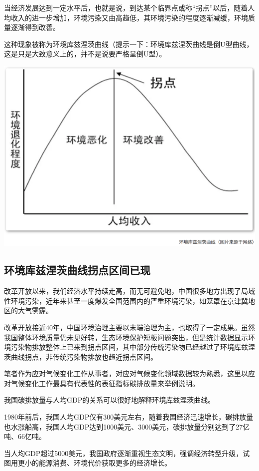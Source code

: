 \documentclass[]{book}
\begin{document}
当经济发展达到一定水平后，也就是说，到达某个临界点或称``拐点''以后，随着人均收入的进一步增加，环境污染又由高趋低，其环境污染的程度逐渐减缓，环境质量逐渐得到改善。

这种现象被称为环境库兹涅茨曲线（提示一下：环境库兹涅茨曲线是倒U型曲线，这是只是大致意义上的，并不是说要严格呈倒U型）。

\includegraphics[width=8.33in]{images/huanjing1}

\subsection{环境库兹涅茨曲线拐点区间已现}

改革开放以来，我们经济水平持续走高，而无可避免地，中国很多地方出现了局域性环境污染，近年来甚至一度爆发全国范围内的严重环境污染，如笼罩在京津冀地区的大气雾霾。

改革开放接近40年，中国环境治理主要以末端治理为主，也取得了一定成果。虽然我国整体环境质量仍未见好转，生态环境保护短板问题突出，但是统计数据显示环境污染物排放整体上已来到拐点区间，其中部分传统污染物已经越过了环境库兹涅茨曲线拐点，非传统污染物排放也趋近拐点区间。

笔者作为应对气候变化工作从事者，对应对气候变化领域数据较为熟悉，这里以应对气候变化工作最具有代表性的表征指标碳排放量来举例说明。

我国碳排放量与人均GDP的关系可以很好地解释环境库兹涅茨曲线。

1980年前后，我国人均GDP仅有300美元左右，随着我国经济迅速增长，碳排放量也水涨船高，我国人均GDP达到1000美元、3000美元，碳排放量分别达到了27亿吨、66亿吨。

当人均GDP超过5000美元，我国政府逐渐重视生态文明，强调经济转型升级，试图用更小的能源消费、环境代价获取更多的经济增长。
\end{document}
